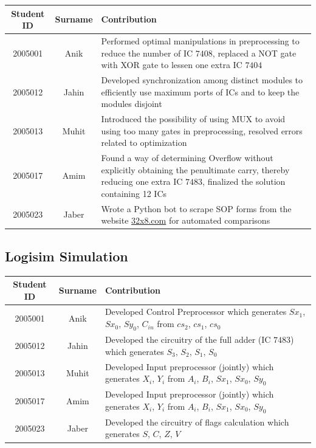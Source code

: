 \documentclass{article}
\begin{document}
\begin{table}[h]
    \centering
\begin{tabular}{|c|c|m{10cm}|}
\hline
Student ID & Surname & Contribution \\ \hline
2005001    & Anik    & Performed optimal manipulations in preprocessing to reduce the number of IC $7408$, replaced a NOT gate with XOR gate to lessen one extra IC $7404$            \\ \hline
2005012    & Jahin   &  Developed synchronization among distinct modules to efficiently use maximum ports of ICs and to keep the modules disjoint            \\ \hline
2005013    & Muhit   &  Introduced the possibility of using MUX to avoid using too many gates in preprocessing, resolved errors related to optimization           \\ \hline
2005017    & Amim    &  Found a way of determining Overflow without explicitly obtaining the penultimate carry, thereby reducing one extra IC $7483$, finalized the solution containing 12 ICs      \\ \hline
2005023    & Jaber   &  Wrote a Python bot to scrape SOP forms from the website \href{http://www.32x8.com/index.html}{32x8.com} for automated comparisons            \\ \hline
\end{tabular}
\end{table}



\subsection{Logisim Simulation}


\begin{table}[h]
    \centering
\begin{tabular}{|c|c|p{10cm}|}
\hline
Student ID & Surname & Contribution \\ \hline
2005001    & Anik    & Developed Control Preprocessor which generates $Sx_1$, $Sx_0$, $Sy_0$, $C_{in}$ from $cs_2$, $cs_1$, $cs_0$            \\ \hline
2005012    & Jahin   & Developed the circuitry of the full adder (IC $7483$)  which generates $S_3$, $S_2$, $S_1$, $S_0$          \\ \hline
2005013    & Muhit   &  Developed Input preprocessor (jointly) which generates $X_i$, $Y_i$ from $A_i$, $B_i$, $Sx_1$, $Sx_0$, $Sy_0$      \\ \hline
2005017    & Amim    &  Developed Input preprocessor (jointly) which generates $X_i$, $Y_i$ from $A_i$, $B_i$, $Sx_1$, $Sx_0$, $Sy_0$      \\ \hline
2005023    & Jaber   &  Developed the circuitry of flags calculation which generates $S$, $C$, $Z$, $V$     \\ \hline
\end{tabular}
\end{table}
\end{document}
